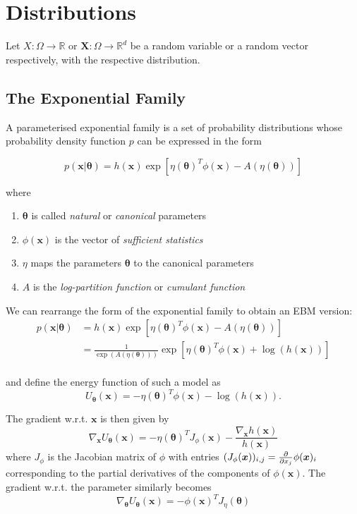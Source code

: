 
\section{Distributions}

Let $X: \Omega \to \mathbb{R}$ or $\bm{X}: \Omega \to \mathbb{R}^d$ be a random variable or a random vector respectively,
with the respective distribution.


\subsection{The Exponential Family}

A parameterised exponential family is a set of probability distributions whose probability density function $p$ can be expressed in the form

\[
	p(\bm{x} | \bm{\theta}) = h(\bm{x}) \exp \left[ \eta(\bm{\theta})^T  \phi(\bm{x}) - A(\eta(\bm{\theta})) \right]
\]

where

\begin{enumerate}
	\item $\bm{\theta}$ is called \textit{natural} or \textit{canonical} parameters
	\item $\phi(\bm{x})$ is the vector of \textit{sufficient statistics}
	\item $\eta$ maps the parameters $\bm{\theta}$ to the canonical parameters
	\item $A$ is the \textit{log-partition function} or \textit{cumulant function}
\end{enumerate}

We can rearrange the form of the exponential family to obtain an EBM version:
\[
\begin{aligned}
	p(\bm{x} | \bm{\theta}) 
	&= h(\bm{x}) \exp \left[ \eta(\bm{\theta})^T  \phi(\bm{x}) - A(\eta(\bm{\theta})) \right] \\
	&= \frac{1}{ \exp \left( A(\eta(\bm{\theta}) ) \right) } \exp \left[ \eta(\bm{\theta})^T  \phi(\bm{x}) + \log(h(\bm{x}))  \right] \\
\end{aligned}
\]

and define the energy function of such a model as
\[
	U_{\bm{\theta}}(\bm{x}) = - \eta(\bm{\theta})^T  \phi(\bm{x}) - \log(h(\bm{x})).
\]

The gradient w.r.t. $\bm{x}$ is then given by
\[
	\nabla_{\bm{x}} U_{\bm{\theta}}(\bm{x}) = - \eta(\bm{\theta})^T  J_{\phi} (\bm{x})  - \frac{\nabla_{\bm{x}} h(\bm{x})}{h(\bm{x})}
\]
where $J_{\phi}$ is the Jacobian matrix of $\phi$ with entries $(J_{\phi} (\bm{x}))_{i, j} = \frac{\partial}{\partial x_j} \phi(\bm{x})_i $ 
corresponding to the partial derivatives of the components of $\phi(\bm{x})$.
The gradient w.r.t. the parameter similarly becomes
\[
	\nabla_{\bm{\theta}} U_{\bm{\theta}}(\bm{x}) = - \phi(\bm{x})^T  J_{\eta} (\bm{\theta}) 
\]


